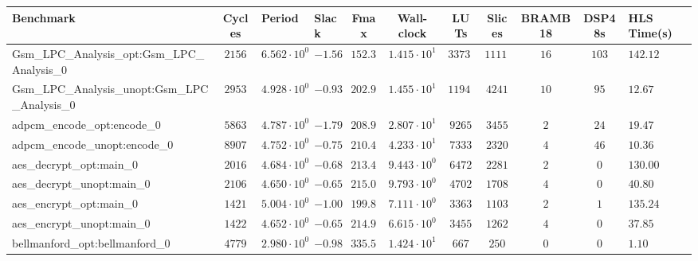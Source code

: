 \begin{tabular}{|l|c|HHc|c|c|c|c|cH|}
\hline
Benchmark                                       & Cycles       & Period                 & Slack     & Fmax       & Wall-clock              & LUTs       & Slices    & BRAMB18 & DSP48s  & HLS Time(s) \\
\hline
Gsm\_LPC\_Analysis\_opt:Gsm\_LPC\_Analysis\_0   & $ 2156     $ & $ 6.562 \cdot 10^{0} $ & $ -1.56 $ & $ 152.39 $ & $ 1.415 \cdot 10^{1}  $ & $ 33733  $ & $ 11116 $ & $ 16  $ & $ 103 $ & $ 142.12  $ \\
Gsm\_LPC\_Analysis\_unopt:Gsm\_LPC\_Analysis\_0 & $ 2953     $ & $ 4.928 \cdot 10^{0} $ & $ -0.93 $ & $ 202.92 $ & $ 1.455 \cdot 10^{1}  $ & $ 11947  $ & $ 4241  $ & $ 10  $ & $ 95  $ & $ 12.67   $ \\
adpcm\_encode\_opt:encode\_0                    & $ 5863     $ & $ 4.787 \cdot 10^{0} $ & $ -1.79 $ & $ 208.90 $ & $ 2.807 \cdot 10^{1}  $ & $ 9265   $ & $ 3455  $ & $ 2   $ & $ 24  $ & $ 19.47   $ \\
adpcm\_encode\_unopt:encode\_0                  & $ 8907     $ & $ 4.752 \cdot 10^{0} $ & $ -0.75 $ & $ 210.44 $ & $ 4.233 \cdot 10^{1}  $ & $ 7333   $ & $ 2320  $ & $ 4   $ & $ 46  $ & $ 10.36   $ \\
aes\_decrypt\_opt:main\_0                       & $ 2016     $ & $ 4.684 \cdot 10^{0} $ & $ -0.68 $ & $ 213.49 $ & $ 9.443 \cdot 10^{0}  $ & $ 6472   $ & $ 2281  $ & $ 2   $ & $ 0   $ & $ 130.00  $ \\
aes\_decrypt\_unopt:main\_0                     & $ 2106     $ & $ 4.650 \cdot 10^{0} $ & $ -0.65 $ & $ 215.05 $ & $ 9.793 \cdot 10^{0}  $ & $ 4702   $ & $ 1708  $ & $ 4   $ & $ 0   $ & $ 40.80   $ \\
aes\_encrypt\_opt:main\_0                       & $ 1421     $ & $ 5.004 \cdot 10^{0} $ & $ -1.00 $ & $ 199.84 $ & $ 7.111 \cdot 10^{0}  $ & $ 3363   $ & $ 1103  $ & $ 2   $ & $ 1   $ & $ 135.24  $ \\
aes\_encrypt\_unopt:main\_0                     & $ 1422     $ & $ 4.652 \cdot 10^{0} $ & $ -0.65 $ & $ 214.96 $ & $ 6.615 \cdot 10^{0}  $ & $ 3455   $ & $ 1262  $ & $ 4   $ & $ 0   $ & $ 37.85   $ \\
bellmanford\_opt:bellmanford\_0                 & $ 4779     $ & $ 2.980 \cdot 10^{0} $ & $ -0.98 $ & $ 335.57 $ & $ 1.424 \cdot 10^{1}  $ & $ 667    $ & $ 250   $ & $ 0   $ & $ 0   $ & $ 1.10    $ \\

\end{tabular}
